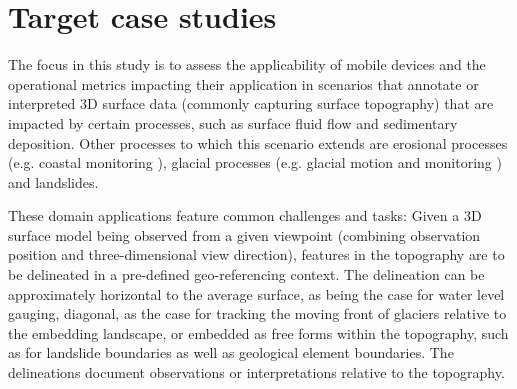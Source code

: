 \documentclass[review]{elsarticle}
\begin{document}

\section{Target case studies}
\label{sec:case_studies}

The focus in this study is to assess the applicability of mobile devices and the operational metrics impacting their application in scenarios that annotate or interpreted 3D surface data (commonly capturing surface topography) that are impacted by certain processes, such as surface fluid flow and sedimentary deposition. Other processes to which this scenario extends are erosional processes (e.g. coastal monitoring \cite{Letortu2017, Medjkane2018}), glacial processes (e.g. glacial motion and monitoring \cite{Schwalbe2017b}) and landslides.

These domain applications feature common challenges and tasks: Given a 3D surface model being observed from a given viewpoint (combining observation position and three-dimensional view direction), features in the topography are to be delineated  in a pre-defined geo-referencing context. The delineation can be approximately horizontal to the average surface, as being the case for water level gauging, diagonal, as the case for tracking the moving front of glaciers relative to the embedding landscape, or embedded as free forms within the topography, such as for landslide boundaries as well as geological element boundaries. The delineations document observations or interpretations relative to the topography.
\end{document}
